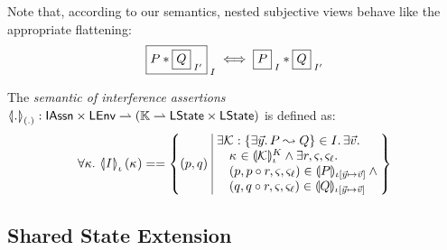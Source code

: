 Note that, according to our semantics, nested subjective views behave
like the appropriate flattening:
\[
	\shared{P * \shared{Q}{I'}}{I} \iff \shared{P}{I} * \shared{Q}{I'}
\]


\begin{definition}\label{def:interferenceSemantics}
The \emph{semantic of interference assertions}
%
$
	\semI[(.)]{.} : \IAssertions \times \LEnv \rightharpoonup (\Caps \rightharpoonup  \LStates \times \LStates )
$
%
is defined as:
%
\[
	\for{\kappa} \semI[\lenv]{I}(\ca{}) ==
	 	\left\{
		\begin{array}{@{}l@{\ }|@{\ }r@{}}
			(p, q)&
			\begin{array}{@{}l@{}}
				\exsts{\interAss{\capAss{}}{\vec{y}}{P}{Q} \in I} \exsts{\vec{v}}\null\\
				\quad\ca{} \in \semK[\lenv]{\capAss{}} \land\exsts{r, \amod{}, \amod{\ell}}\\
				\quad(p, p \composeL r, \amod{}, \amod{\ell}) \in \intermediateSem[\lenv\text{[} \vec{y} \mapsto \vec{v} \text{]}]{P} \land\null\\
				\quad(q, q \composeL r, \amod{}, \amod{\ell}) \in \intermediateSem[\lenv\text{[} \vec{y} \mapsto \vec{v} \text{]}]{Q} 
			\end{array}
		\end{array}
	\right\}
\]
\end{definition}


\subsection{Shared State Extension}
\label{subsec:extension}


